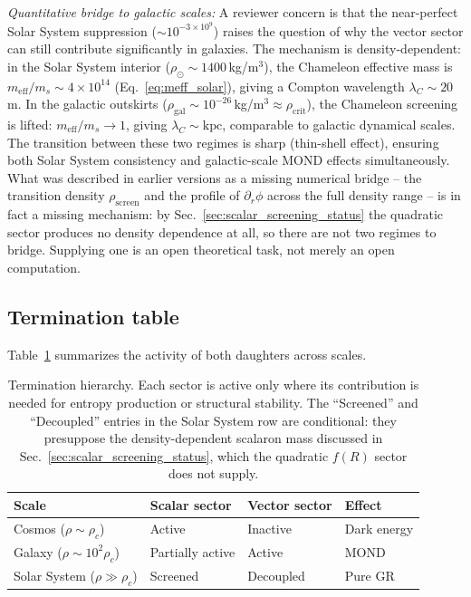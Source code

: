 \documentclass[aps,prd,twocolumn,superscriptaddress,nofootinbib]{revtex4-2}
\begin{document}
\textit{Quantitative bridge to galactic scales:} A reviewer concern is that the near-perfect Solar System suppression ($\sim 10^{-3 \times 10^9}$) raises the question of why the vector sector can still contribute significantly in galaxies. The mechanism is density-dependent: in the Solar System interior ($\rho_\odot \sim 1400$\,kg/m$^3$), the Chameleon effective mass is $m_\mathrm{eff}/m_s \sim 4 \times 10^{14}$ (Eq.~\eqref{eq:meff_solar}), giving a Compton wavelength $\lambda_C \sim 20$\,m. In the galactic outskirts ($\rho_\mathrm{gal} \sim 10^{-26}$\,kg/m$^3 \approx \rho_\mathrm{crit}$), the Chameleon screening is lifted: $m_\mathrm{eff}/m_s \to 1$, giving $\lambda_C \sim \mathrm{kpc}$, comparable to galactic dynamical scales. The transition between these two regimes is sharp (thin-shell effect), ensuring both Solar System consistency and galactic-scale MOND effects simultaneously. What was described in earlier versions as a missing numerical bridge -- the transition density $\rho_\mathrm{screen}$ and the profile of $\partial_r\phi$ across the full density range -- is in fact a missing mechanism: by Sec.~\ref{sec:scalar_screening_status} the quadratic sector produces no density dependence at all, so there are not two regimes to bridge. Supplying one is an open theoretical task, not merely an open computation.

\subsection{Termination table}

Table~\ref{tab:termination} summarizes the activity of both daughters across scales.

\begin{table}[tbp]
\caption{\label{tab:termination}Termination hierarchy. Each sector is active only where its contribution is needed for entropy production or structural stability. The ``Screened'' and ``Decoupled'' entries in the Solar System row are conditional: they presuppose the density-dependent scalaron mass discussed in Sec.~\ref{sec:scalar_screening_status}, which the quadratic $f(R)$ sector does not supply.}
\begin{ruledtabular}
\begin{tabular}{llll}
Scale & Scalar sector & Vector sector & Effect \\
\hline
Cosmos ($\rho \sim \rho_c$) & Active & Inactive & Dark energy \\
Galaxy ($\rho \sim 10^2\rho_c$) & Partially active & Active & MOND \\
Solar System ($\rho \gg \rho_c$) & Screened & Decoupled & Pure GR \\
\end{tabular}
\end{ruledtabular}
\end{table}
\end{document}
